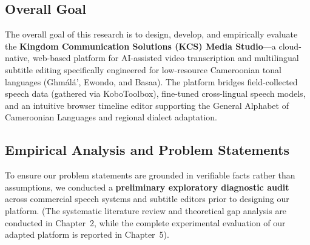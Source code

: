 \documentclass[a4paper,11pt]{article}
\begin{document}
\subsection{Overall Goal}
\label{sec:chap1_goal}

The overall goal of this research is to design, develop, and empirically evaluate the \textbf{Kingdom Communication Solutions (KCS) Media Studio}—a cloud-native, web-based platform for AI-assisted video transcription and multilingual subtitle editing specifically engineered for low-resource Cameroonian tonal languages (Gh\textopeno m\'al\'a', Ewondo, and Basaa). The platform bridges field-collected speech data (gathered via KoboToolbox), fine-tuned cross-lingual speech models, and an intuitive browser timeline editor supporting the General Alphabet of Cameroonian Languages and regional dialect adaptation.

\subsection{Empirical Analysis and Problem Statements}
\label{sec:chap1_problem_statements}

To ensure our problem statements are grounded in verifiable facts rather than assumptions, we conducted a \textbf{preliminary exploratory diagnostic audit} across commercial speech systems and subtitle editors prior to designing our platform. (The systematic literature review and theoretical gap analysis are conducted in Chapter~2, while the complete experimental evaluation of our adapted platform is reported in Chapter~5).
\end{document}
